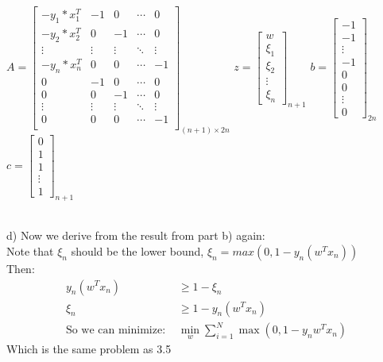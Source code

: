 \documentclass[12pt]{article}
\begin{document}
\begin{center}
$A = \begin{bmatrix}
    -y_1*x_1^T  & -1 & 0 & \cdots & 0\\
    -y_2*x_2^T  & 0  & -1 & \cdots & 0 \\
    \vdots & \vdots & \vdots & \ddots & \vdots\\
    -y_n*x_n^T  & 0  & 0 & \cdots & -1 \\
    0 & -1 & 0 & \cdots & 0\\
    0 &  0 & -1 & \cdots & 0\\
    \vdots & \vdots & \vdots & \ddots & \vdots\\
    0 & 0  & 0 & \cdots & -1\\
\end{bmatrix}_{(n+1)\times 2n}$
$z = \begin{bmatrix}
w\\\xi_1\\ \xi_2\\ \vdots \\ \xi_n
\end{bmatrix}_{n+1}$
$b = \begin{bmatrix}
-1 \\ -1 \\ \vdots \\-1 \\0 \\0 \\ \vdots \\0
\end{bmatrix}_{2n}$
$c = \begin{bmatrix}
0 \\ 1 \\ 1 \\ \vdots \\1
\end{bmatrix}_{n+1}$
\end{center} \indent \\
d) Now we derive from the result from part b) again:\\
Note that $\xi_n$ should be the lower bound, $\xi_n = max(0,1-y_n(w^Tx_n))$\\
Then:
\begin{align*} \displaystyle
y_n(w^Tx_n) & \geq 1 - \xi_n \\
\xi_n & \geq 1 - y_n(w^Tx_n)\\ 
\mbox{So we can minimize:     }& \min_w \sum_{i = 1}^{N}\max (0,1-y_nw^Tx_n)
\end{align*}  Which is the same problem as 3.5
\end{document}

